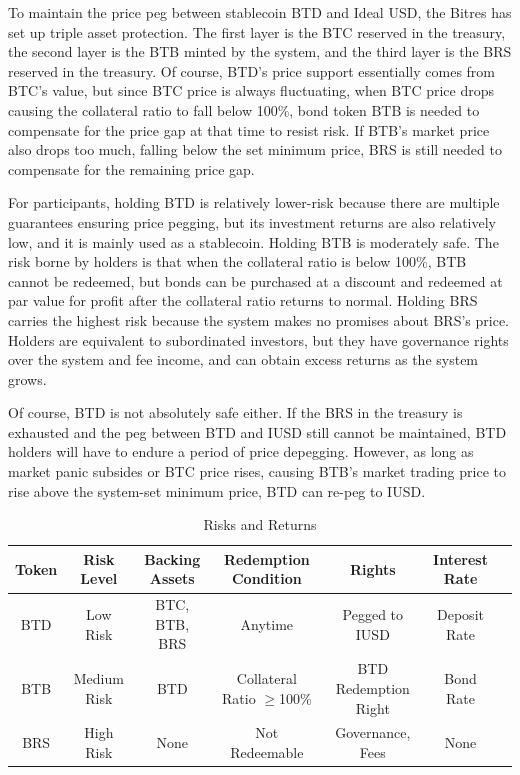 \documentclass{article}
\begin{document}
To maintain the price peg between stablecoin BTD and Ideal USD, the Bitres has set up triple asset protection. The first layer is the BTC reserved in the treasury, the second layer is the BTB minted by the system, and the third layer is the BRS reserved in the treasury. Of course, BTD's price support essentially comes from BTC's value, but since BTC price is always fluctuating, when BTC price drops causing the collateral ratio to fall below 100\%, bond token BTB is needed to compensate for the price gap at that time to resist risk. If BTB's market price also drops too much, falling below the set minimum price, BRS is still needed to compensate for the remaining price gap.

For participants, holding BTD is relatively lower-risk because there are multiple guarantees ensuring price pegging, but its investment returns are also relatively low, and it is mainly used as a stablecoin. Holding BTB is moderately safe. The risk borne by holders is that when the collateral ratio is below 100\%, BTB cannot be redeemed, but bonds can be purchased at a discount and redeemed at par value for profit after the collateral ratio returns to normal. Holding BRS carries the highest risk because the system makes no promises about BRS's price. Holders are equivalent to subordinated investors, but they have governance rights over the system and fee income, and can obtain excess returns as the system grows.

Of course, BTD is not absolutely safe either. If the BRS in the treasury is exhausted and the peg between BTD and IUSD still cannot be maintained, BTD holders will have to endure a period of price depegging. However, as long as market panic subsides or BTC price rises, causing BTB's market trading price to rise above the system-set minimum price, BTD can re-peg to IUSD.

\begin{table}[h]
\centering
\caption{Risks and Returns}
\label{tab:risk-return}
\begin{tabular}{c|c|c|c|c|c|c}
\toprule
 Token & Risk Level & Backing Assets & Redemption Condition & Rights & Interest Rate\\
\midrule
BTD & Low Risk & BTC, BTB, BRS & Anytime & Pegged to IUSD & Deposit Rate\\
BTB & Medium Risk & BTD & Collateral Ratio $\geq$100\% & BTD Redemption Right & Bond Rate\\
BRS & High Risk & None & Not Redeemable & Governance, Fees & None\\
\bottomrule
\end{tabular}
\end{table}
\end{document}
